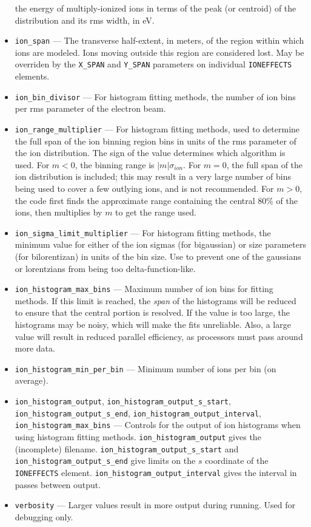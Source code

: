 \documentclass[11pt]{article}
\begin{document}
\begin{itemize}
  the energy of multiply-ionized ions in terms of the peak (or centroid) of the distribution and its rms width, in eV.
\item \verb|ion_span| --- The transverse half-extent, in meters, of the region within which ions are modeled.
  Ions moving outside this region are considered lost. May be overriden by the \verb|X_SPAN| and \verb|Y_SPAN| parameters
  on individual \verb|IONEFFECTS| elements.
\item \verb|ion_bin_divisor| --- For histogram fitting methods, the number of ion bins per rms parameter of the electron beam.
\item \verb|ion_range_multiplier| --- For  histogram fitting methods,
  used to determine the full span of the ion binning region bins in units of the rms parameter of the ion distribution.
  The sign of the value determines which algorithm is used.
  For $m<0$, the binning range is $\left|m\right|\sigma_{ion}$.
  For $m=0$, the full span of the ion distribution is included; this may result in a very large number of bins being
  used to cover a few outlying ions, and is not recommended.
  For $m>0$, the code first finds the approximate range containing the central 80\% of the ions, then multiplies by
  $m$ to get the range used.
\item \verb|ion_sigma_limit_multiplier| --- For  histogram fitting methods,
  the minimum value for either of the ion sigmas (for bigaussian) or size parameters (for bilorentizan)
  in units of the bin size. Use to prevent one of the gaussians or lorentzians from being too delta-function-like.
\item \verb|ion_histogram_max_bins| --- Maximum number of ion bins for fitting methods.
  If this limit is reached, the {\em span} of the histograms will  be reduced to ensure that the central portion is
  resolved.
  If the value is  too large, the histograms may
  be noisy, which will make the fits unreliable. Also, a large value will result in reduced parallel efficiency, as
  processors must pass around more data. 
\item \verb|ion_histogram_min_per_bin| --- Minimum number of ions per bin (on average).
\item \verb|ion_histogram_output|, \verb|ion_histogram_output_s_start|, \verb|ion_histogram_output_s_end|, 
      \verb|ion_histogram_output_interval|, \verb|ion_histogram_max_bins| --- Controls for the output of ion histograms when
      using histogram fitting methods.
      \verb|ion_histogram_output| gives the (incomplete) filename.
      \verb|ion_histogram_output_s_start| and \verb|ion_histogram_output_s_end| give limits on the $s$ coordinate of the
      \verb|IONEFFECTS| element. \verb|ion_histogram_output_interval| gives the interval in passes between output.
\item \verb|verbosity| --- Larger values result in more output during running. Used for debugging only.
\end{itemize}
\end{document}
